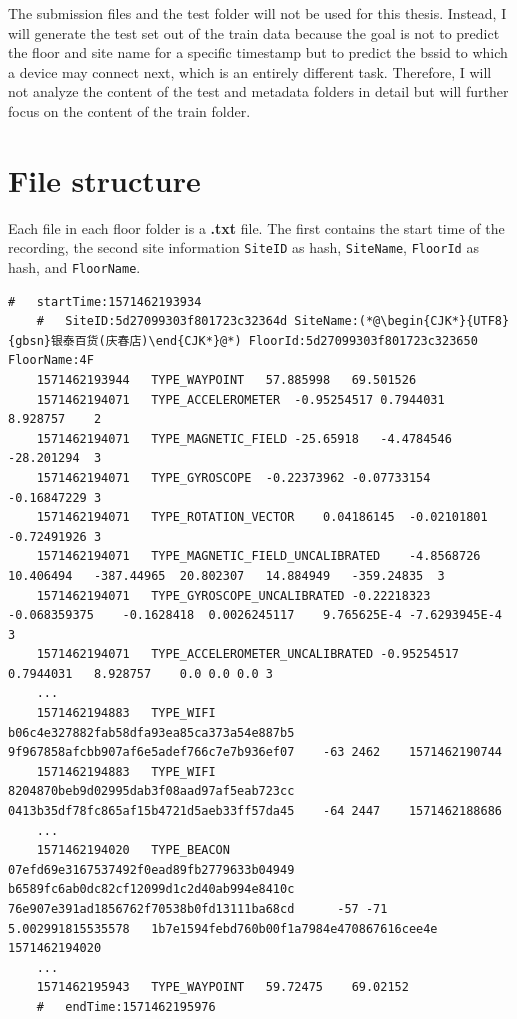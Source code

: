 The submission files and the test folder will not be used for this thesis.
Instead, I will generate the test set out of the train data because the goal is not to predict the floor and site name for a specific timestamp but to predict the \ac{bssid} to which a device may connect next, which is an entirely different task.
Therefore, I will not analyze the content of the test and metadata folders in detail but will further focus on the content of the train folder.


\section{File structure}\label{sec:file-structure}

Each file in each floor folder is a \textbf{.txt} file.
The first contains the start time of the recording, the second site information \texttt{SiteID} as hash, \texttt{SiteName}, \texttt{FloorId} as hash, and \texttt{FloorName}.


\begin{lstlisting}[caption={A snippet from the dataset of the file 5daa9e38df065a00069beb79.txt of the floor F4},label={lst:dataset}]
    #   startTime:1571462193934
    #   SiteID:5d27099303f801723c32364d SiteName:(*@\begin{CJK*}{UTF8}{gbsn}银泰百货(庆春店)\end{CJK*}@*) FloorId:5d27099303f801723c323650 FloorName:4F
    1571462193944   TYPE_WAYPOINT   57.885998   69.501526
    1571462194071   TYPE_ACCELEROMETER  -0.95254517 0.7944031   8.928757    2
    1571462194071   TYPE_MAGNETIC_FIELD -25.65918   -4.4784546  -28.201294  3
    1571462194071   TYPE_GYROSCOPE  -0.22373962 -0.07733154 -0.16847229 3
    1571462194071   TYPE_ROTATION_VECTOR    0.04186145  -0.02101801 -0.72491926 3
    1571462194071   TYPE_MAGNETIC_FIELD_UNCALIBRATED    -4.8568726  10.406494   -387.44965  20.802307   14.884949   -359.24835  3
    1571462194071   TYPE_GYROSCOPE_UNCALIBRATED -0.22218323 -0.068359375    -0.1628418  0.0026245117    9.765625E-4 -7.6293945E-4   3
    1571462194071   TYPE_ACCELEROMETER_UNCALIBRATED -0.95254517 0.7944031   8.928757    0.0 0.0 0.0 3
    ...
    1571462194883   TYPE_WIFI   b06c4e327882fab58dfa93ea85ca373a54e887b5    9f967858afcbb907af6e5adef766c7e7b936ef07    -63 2462    1571462190744
    1571462194883   TYPE_WIFI   8204870beb9d02995dab3f08aad97af5eab723cc    0413b35df78fc865af15b4721d5aeb33ff57da45    -64 2447    1571462188686
    ...
    1571462194020   TYPE_BEACON 07efd69e3167537492f0ead89fb2779633b04949    b6589fc6ab0dc82cf12099d1c2d40ab994e8410c    76e907e391ad1856762f70538b0fd13111ba68cd      -57 -71 5.002991815535578   1b7e1594febd760b00f1a7984e470867616cee4e    1571462194020
    ...
    1571462195943   TYPE_WAYPOINT   59.72475    69.02152
    #   endTime:1571462195976
\end{lstlisting}


